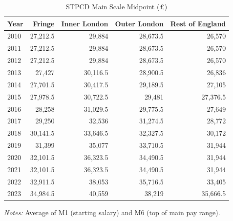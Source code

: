 \begin{table}[htbp]
\centering
\caption{STPCD Main Scale Midpoint (\pounds)}
\label{tab:stpcd}
\begin{tabular}{lrrrr}
\toprule
Year & Fringe & Inner London & Outer London & Rest of England \\
\midrule
2010 & 27,212.5 & 29,884 & 28,673.5 & 26,570 \\
2011 & 27,212.5 & 29,884 & 28,673.5 & 26,570 \\
2012 & 27,212.5 & 29,884 & 28,673.5 & 26,570 \\
2013 & 27,427 & 30,116.5 & 28,900.5 & 26,836 \\
2014 & 27,701.5 & 30,417.5 & 29,189.5 & 27,105 \\
2015 & 27,978.5 & 30,722.5 & 29,481 & 27,376.5 \\
2016 & 28,258 & 31,029.5 & 29,775.5 & 27,649 \\
2017 & 29,250 & 32,536 & 31,274.5 & 28,772 \\
2018 & 30,141.5 & 33,646.5 & 32,327.5 & 30,172 \\
2019 & 31,399 & 35,077 & 33,710.5 & 31,944 \\
2020 & 32,101.5 & 36,323.5 & 34,490.5 & 31,944 \\
2021 & 32,101.5 & 36,323.5 & 34,490.5 & 31,944 \\
2022 & 32,911.5 & 38,053 & 35,716.5 & 33,405 \\
2023 & 34,984.5 & 40,559 & 38,219 & 35,666.5 \\
\bottomrule
\end{tabular}
\begin{tablenotes}[flushleft]
\small
\item \textit{Notes:} Average of M1 (starting salary) and M6 (top of main pay range).
\end{tablenotes}
\end{table}
